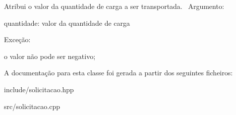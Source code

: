 Atribui o valor da quantidade de carga a ser transportada.~\newline
 Argumento\+:
\begin{DoxyItemize}
\item quantidade\+: valor da quantidade de carga
\end{DoxyItemize}

Exceção\+:
\begin{DoxyItemize}
\item o valor não pode ser negativo;
\end{DoxyItemize}

A documentação para esta classe foi gerada a partir dos seguintes ficheiros\+:\begin{DoxyCompactItemize}
\item 
include/solicitacao.\+hpp\item 
src/solicitacao.\+cpp\end{DoxyCompactItemize}
